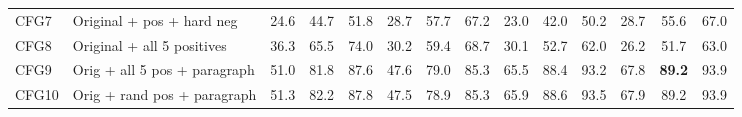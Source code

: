 \begin{table}[t]
\begin{adjustbox}{max width=\textwidth}
\begin{tabular}{llcccccccccccc}
CFG7 & Original + pos + hard neg & 24.6 & 44.7 & 51.8 & 28.7 & 57.7 & 67.2 & 23.0 & 42.0 & 50.2 & 28.7 & 55.6 & 67.0 \\
CFG8 & Original + all 5 positives & 36.3 & 65.5 & 74.0 & 30.2 & 59.4 & 68.7 & 30.1 & 52.7 & 62.0 & 26.2 & 51.7 & 63.0 \\
CFG9 & Orig + all 5 pos + paragraph & 51.0 & 81.8 & 87.6 & 47.6 & 79.0 & 85.3 & 65.5 & 88.4 & 93.2 & 67.8 & \textbf{89.2} & 93.9 \\
CFG10 & Orig + rand pos + paragraph & 51.3 & 82.2 & 87.8 & 47.5 & 78.9 & 85.3 & 65.9 & 88.6 & 93.5 & 67.9 & 89.2 & 93.9 \\
\bottomrule
\end{tabular}
\end{adjustbox}
\end{table}
